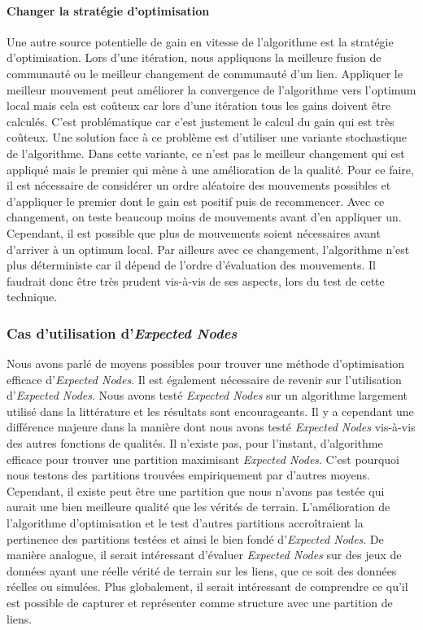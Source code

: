 \paragraph{Changer la stratégie d'optimisation}
Une autre source potentielle de gain en vitesse de l'algorithme est la stratégie d'optimisation.
Lors d'une itération, nous appliquons la meilleure fusion de communauté ou le meilleur changement de communauté d'un lien.
Appliquer le meilleur mouvement peut améliorer la convergence de l'algorithme vers l'optimum local mais cela est coûteux car lors d'une itération tous les gains doivent être calculés.
C'est problématique car c'est justement le calcul du gain qui est très coûteux.
Une solution face à ce problème est d'utiliser une variante stochastique de l'algorithme.
Dans cette variante, ce n'est pas le meilleur changement qui est appliqué mais le premier qui mène à une amélioration de la qualité.
Pour ce faire, il est nécessaire de considérer un ordre aléatoire des mouvements possibles et d'appliquer le premier dont le gain est positif puis de recommencer.
Avec ce changement, on teste beaucoup moins de mouvements avant d'en appliquer un.
Cependant, il est possible que plus de mouvements soient nécessaires avant d'arriver à un optimum local.
Par ailleurs avec ce changement, l'algorithme n'est plus déterministe car il dépend de l'ordre d'évaluation des mouvements.
Il faudrait donc être très prudent vis-à-vis de ses aspects, lors du test de cette technique.

\subsubsection{Cas d'utilisation d'\emph{Expected Nodes}}
Nous avons parlé de moyens possibles pour trouver une méthode d'optimisation efficace d'\emph{Expected Nodes}.
Il est également nécessaire de revenir sur l'utilisation d'\emph{Expected Nodes}.
Nous avons testé \emph{Expected Nodes} sur un algorithme largement utilisé dans la littérature et les résultats sont encourageants.
Il y a cependant une différence majeure dans la manière dont nous avons testé \emph{Expected Nodes} vis-à-vis des autres fonctions de qualités.
Il n'existe pas, pour l'instant, d'algorithme efficace pour trouver une partition maximisant \emph{Expected Nodes}.
C'est pourquoi nous testons des partitions trouvées empiriquement par d'autres moyens.
Cependant, il existe peut être une partition que nous n'avons pas testée qui aurait une bien meilleure qualité que les vérités de terrain.
L'amélioration de l'algorithme d'optimisation et le test d'autres partitions accroîtraient la pertinence des partitions testées et ainsi le bien fondé d'\emph{Expected Nodes}.
De manière analogue, il serait intéressant d'évaluer \emph{Expected Nodes} sur des jeux de données ayant une réelle vérité de terrain sur les liens, que ce soit des données réelles ou simulées.
Plus globalement, il serait intéressant de comprendre ce qu'il est possible de capturer et représenter comme structure avec une partition de liens.


